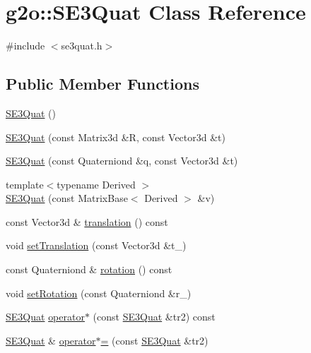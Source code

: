\hypertarget{classg2o_1_1_s_e3_quat}{}\section{g2o\+:\+:S\+E3\+Quat Class Reference}
\label{classg2o_1_1_s_e3_quat}


{\ttfamily \#include $<$se3quat.\+h$>$}

\subsection*{Public Member Functions}
\begin{DoxyCompactItemize}
\item 
\mbox{\hyperlink{classg2o_1_1_s_e3_quat_a685de01e417e01f84d5b8389e5f5f333}{S\+E3\+Quat}} ()
\item 
\mbox{\hyperlink{classg2o_1_1_s_e3_quat_abb3e9184aa02bf6ced3f6d4cd0825f33}{S\+E3\+Quat}} (const Matrix3d \&R, const Vector3d \&t)
\item 
\mbox{\hyperlink{classg2o_1_1_s_e3_quat_ab22b3fde9b7e0a833b74b3453041c040}{S\+E3\+Quat}} (const Quaterniond \&q, const Vector3d \&t)
\item 
{\footnotesize template$<$typename Derived $>$ }\\\mbox{\hyperlink{classg2o_1_1_s_e3_quat_ada36ff00a7a238cef3fe958ff9f7f9cd}{S\+E3\+Quat}} (const Matrix\+Base$<$ Derived $>$ \&v)
\item 
const Vector3d \& \mbox{\hyperlink{classg2o_1_1_s_e3_quat_a3f36961ad875394c3d305883bebb26bc}{translation}} () const
\item 
void \mbox{\hyperlink{classg2o_1_1_s_e3_quat_aaf12f03b09b2a3a4c9185edcc8b141cb}{set\+Translation}} (const Vector3d \&t\+\_\+)
\item 
const Quaterniond \& \mbox{\hyperlink{classg2o_1_1_s_e3_quat_a7345da50450b60ae725083fbdb85eb7d}{rotation}} () const
\item 
void \mbox{\hyperlink{classg2o_1_1_s_e3_quat_a1f55879ec2e4801d5de4b12b301ff59c}{set\+Rotation}} (const Quaterniond \&r\+\_\+)
\item 
\mbox{\hyperlink{classg2o_1_1_s_e3_quat}{S\+E3\+Quat}} \mbox{\hyperlink{classg2o_1_1_s_e3_quat_a1258baef15096f3176a3454258a132c9}{operator$\ast$}} (const \mbox{\hyperlink{classg2o_1_1_s_e3_quat}{S\+E3\+Quat}} \&tr2) const
\item 
\mbox{\hyperlink{classg2o_1_1_s_e3_quat}{S\+E3\+Quat}} \& \mbox{\hyperlink{classg2o_1_1_s_e3_quat_a0b0c9d2ff23d7e1501bc79a32e958239}{operator$\ast$=}} (const \mbox{\hyperlink{classg2o_1_1_s_e3_quat}{S\+E3\+Quat}} \&tr2)

\end{DoxyCompactItemize}
